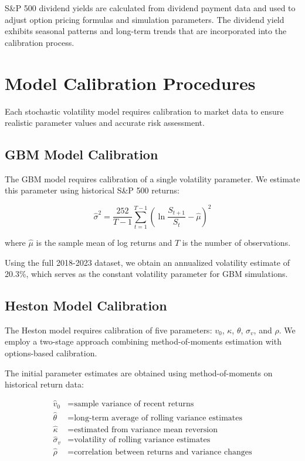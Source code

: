 \documentclass[12pt,a4paper]{report}
\begin{document}
S\&P 500 dividend yields are calculated from dividend payment data and used to adjust option pricing formulas and simulation parameters. The dividend yield exhibits seasonal patterns and long-term trends that are incorporated into the calibration process.

\section{Model Calibration Procedures}

Each stochastic volatility model requires calibration to market data to ensure realistic parameter values and accurate risk assessment.

\subsection{GBM Model Calibration}

The GBM model requires calibration of a single volatility parameter. We estimate this parameter using historical S\&P 500 returns:

\begin{equation}
\hat{\sigma}^2 = \frac{252}{T-1} \sum_{t=1}^{T-1} \left(\ln\frac{S_{t+1}}{S_t} - \hat{\mu}\right)^2
\end{equation}

where $\hat{\mu}$ is the sample mean of log returns and $T$ is the number of observations.

Using the full 2018-2023 dataset, we obtain an annualized volatility estimate of 20.3\%, which serves as the constant volatility parameter for GBM simulations.

\subsection{Heston Model Calibration}

The Heston model requires calibration of five parameters: $v_0$, $\kappa$, $\theta$, $\sigma_v$, and $\rho$. We employ a two-stage approach combining method-of-moments estimation with options-based calibration.

The initial parameter estimates are obtained using method-of-moments on historical return data:

\begin{align}
\hat{v}_0 &= \text{sample variance of recent returns} \\
\hat{\theta} &= \text{long-term average of rolling variance estimates} \\
\hat{\kappa} &= \text{estimated from variance mean reversion} \\
\hat{\sigma}_v &= \text{volatility of rolling variance estimates} \\
\hat{\rho} &= \text{correlation between returns and variance changes}
\end{align}
\end{document}
